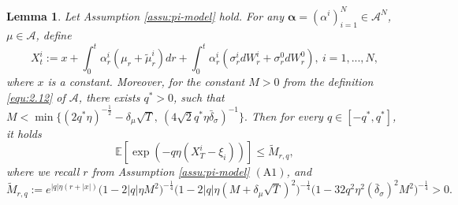\documentclass[10pt,a4paper]{article}
\newcommand{\Balpha}{\boldsymbol{\alpha}}
\theoremstyle{plain}
\newtheorem{Lemma}[Theorem]{Lemma}
\theoremstyle{definition}
\numberwithin{equation}{section}
\begin{document}
\begin{Lemma}
\label{Lemma6.2}
Let Assumption \ref{assu:pi-model} hold. 
For any $\Balpha=(\alpha^i)_{i=1}^N \in \mathcal{A}^{N}$, $\mu \in \mathcal{A}$, define
\[
X_{t}^{i} := x + \int_{0}^{t}\alpha_{r}^{i}(\mu_{r}+\tilde{\mu}_{r}^{i})dr + \int_{0}^{t}\alpha_{r}^{i}(\sigma_{r}^{i}dW_{r}^{i}+\sigma_{r}^{0}dW_{r}^{0}),\  i=1,...,N,
\] 
where $x$ is a constant. Moreover, for the constant $M>0$ from the definition \eqref{equ:2.12} of $\mathcal{A}$, there exists $q^{*}>0$, such that 
$
M  < \min\Big\{(2q^{*}\eta)^{-\tfrac{1}{2}} - \delta_{\mu}\sqrt{T} , \ (4\sqrt{2}q^{*}\eta\bar{\delta}_{\sigma})^{-1}\Big\}.
$
Then for every $q \in [-q^{*},q^{*}]$, it holds
\[
\mathbb{E}[\exp(-q\eta(X_{T}^{i}-\xi_{i}))] \leq \tilde{M}_{r,q},
\]
where we recall $r$ from Assumption \ref{assu:pi-model} $\mathrm{(A1)}$, and 
$$
\tilde{M}_{r,q} := e^{|q|\eta(r+|x|)}\big(1-2|q|\eta M^{2}\big)^{-\tfrac{1}{4}}\big(1-2|q|\eta (M+\delta_{\mu}\sqrt{T})^{2}\big)^{-\tfrac{1}{4}}\big(1-32q^{2}\eta^{2}(\bar{\delta}_{\sigma})^{2}M^{2}\big)^{-\tfrac{1}{4}} >0.
$$
\end{Lemma}
\end{document}

